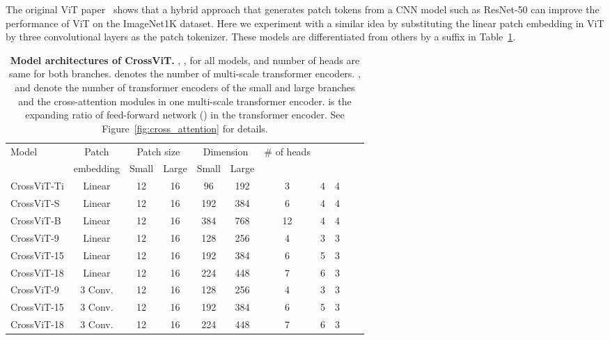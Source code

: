 \documentclass[10pt,twocolumn,letterpaper]{article}
\def\ours{CrossViT\xspace}
\begin{document}
The original ViT paper~\cite{ViT_dosovitskiy2021an} shows that a hybrid approach that generates patch tokens from a CNN model such as ResNet-50 can improve the performance of ViT on the ImageNet1K dataset. Here we experiment with a similar idea by substituting the linear patch embedding in ViT by three convolutional layers as the patch tokenizer. These models are differentiated from others by a suffix  in Table~\ref{table:models}. 

\begin{table}[t]
    \centering
    \begin{adjustbox}{max width=\linewidth}
    \begin{tabular}{l|cccccccccc}
        \toprule
                      Model & Patch  & \multicolumn{2}{c}{Patch size} & \multicolumn{2}{c}{Dimension} & \# of heads &  &  \\
                      & embedding & Small & Large & Small & Large &  \\
        \midrule
        \ours-Ti & Linear & 12 & 16 & 96& 192 & 3 & 4 & 4  \\
        \ours-S & Linear & 12 & 16 & 192& 384 & 6 & 4 & 4  \\
        \ours-B & Linear & 12 & 16 & 384& 768 & 12 & 4 & 4  \\
        \ours-9 & Linear & 12 & 16 & 128& 256 & 4 & 3 & 3  \\
        \ours-15 & Linear & 12 & 16 & 192& 384 & 6 & 5 & 3  \\
        \ours-18 & Linear & 12 & 16 & 224& 448 & 7 & 6 & 3  \\
        \ours-9 & 3 Conv. & 12 & 16 & 128& 256 & 4 & 3 & 3  \\
        \ours-15 & 3 Conv. & 12 & 16 & 192& 384 & 6 & 5 & 3  \\
        \ours-18 & 3 Conv. & 12 & 16 & 224& 448 & 7 & 6 & 3  \\
        
        \bottomrule
    \end{tabular}
    \end{adjustbox}
\caption{\textbf{Model architectures of \ours.} , ,  for all models, and number of heads are same for both branches.
     denotes the number of multi-scale transformer encoders. ,  and  denote the number of transformer encoders of the small and large branches and the cross-attention modules in one multi-scale transformer encoder.  is the expanding ratio of feed-forward network () in the transformer encoder. See Figure~\ref{fig:cross_attention} for details.}
\label{table:models}
\end{table}
\end{document}
